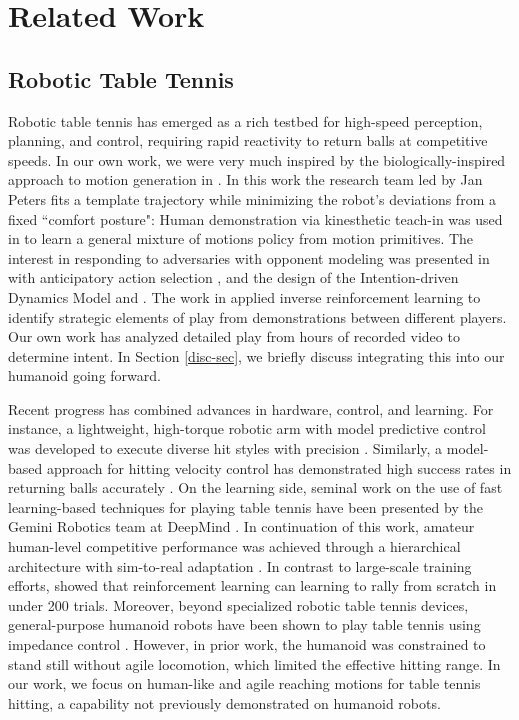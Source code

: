 \section{Related Work}

\subsection{Robotic Table Tennis}
Robotic table tennis has emerged as a rich testbed for high-speed perception, planning, and control, requiring rapid reactivity to return balls at competitive speeds.  In our own work, we were very much inspired by the  biologically-inspired approach to motion generation in \cite{mulling2010biomimetic, mulling2011biomimetic}. In this work the research team led by Jan Peters fits a template trajectory while minimizing the robot's deviations from a fixed ``comfort posture": Human demonstration via kinesthetic teach-in was used in \cite{mulling2013generalizestrike} to learn  a general mixture of motions policy from motion primitives. 
The interest in responding to adversaries  with  opponent modeling was presented in \cite{Wang_Boularias_Mülling_Peters_2011} with  anticipatory action selection \cite{6094892}, and  the design of the Intention-driven Dynamics Model \cite{Wang2013} and \cite{WANG2017399}. The work in \cite{MullingBMSP2014} applied inverse reinforcement learning to identify strategic elements of play from demonstrations between different players. Our own work has analyzed detailed play from hours of recorded video \cite{etaat2025latte} to determine intent. In  Section \ref{disc-sec}, we briefly discuss integrating this into our humanoid going forward. 

Recent progress has combined advances in hardware, control, and learning. For instance, a lightweight, high-torque robotic arm with model predictive control was developed to execute diverse hit styles with precision \cite{nguyen2025high}. Similarly, a model-based approach for hitting velocity control has demonstrated high success rates in returning balls accurately \cite{ji2021model}. On the learning side, seminal work on the use of fast learning-based techniques for playing table tennis have been presented by the Gemini Robotics team at DeepMind \cite{Sanketi2023, amor2025sas}. In continuation of this work, amateur human-level competitive performance was achieved through a hierarchical architecture with sim-to-real adaptation \cite{d2024achieving}. In contrast to large-scale training efforts, \cite{tebbe2021sample} showed that  reinforcement learning can learning to rally from scratch in under 200 trials. Moreover, beyond specialized robotic table tennis devices, general-purpose humanoid robots have been shown to play table tennis using impedance control \cite{xiong2012impedance}. However, in prior work, the humanoid was constrained to stand still without agile locomotion, which limited the effective hitting range. In our work, we focus on human-like and agile reaching motions for table tennis hitting, a capability not previously demonstrated on humanoid robots.

